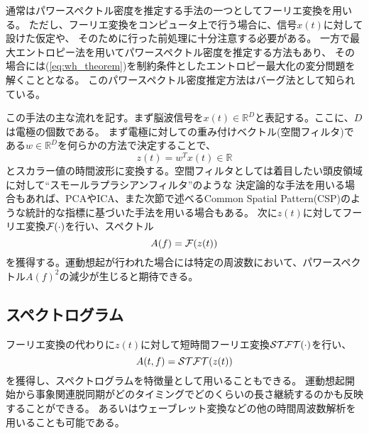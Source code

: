 通常はパワースペクトル密度を推定する手法の一つとしてフーリエ変換を用いる。
ただし、フーリエ変換をコンピュータ上で行う場合に、信号\(x(t)\)に対して設けた仮定や、
そのために行った前処理に十分注意する必要がある。
一方で最大エントロピー法を用いてパワースペクトル密度を推定する方法もあり、
その場合には(\ref{eq:wh_theorem})を制約条件としたエントロピー最大化の変分問題を解くこととなる。
このパワースペクトル密度推定方法はバーグ法として知られている。

この手法の主な流れを記す。まず脳波信号を\(x(t) \in \mathbb{R}^D\)と表記する。ここに、\(D\)は電極の個数である。
まず電極に対しての重み付けベクトル(空間フィルタ)である$w \in \mathbb{R}^D$を何らかの方法で決定することで、
\begin{equation}
    z(t) = w^T x(t) \in \mathbb{R}    
\end{equation}
とスカラー値の時間波形に変換する。空間フィルタとしては着目したい頭皮領域に対して``スモールラプラシアンフィルタ''のような
決定論的な手法を用いる場合もあれば、PCAやICA、また次節で述べるCommon Spatial Pattern(CSP)のような統計的な指標に基づいた手法を用いる場合もある。
次に$z(t)$に対してフーリエ変換${\cal F}(\cdot)$を行い、スペクトル
\begin{equation}
    A(f) = {\cal F}(z(t))
\end{equation}
を獲得する。運動想起が行われた場合には特定の周波数において、パワースペクトル\(A(f)^2\)の減少が生じると期待できる。

\subsection{スペクトログラム}
フーリエ変換の代わりに$z(t)$に対して短時間フーリエ変換${\cal STFT}(\cdot)$を行い、
\begin{equation}
    A(t,f) = {\cal STFT}(z(t))
\end{equation}
を獲得し、スペクトログラムを特徴量として用いることもできる。
運動想起開始から事象関連脱同期がどのタイミングでどのくらいの長さ継続するのかも反映することができる。
あるいはウェーブレット変換などの他の時間周波数解析を用いることも可能である。